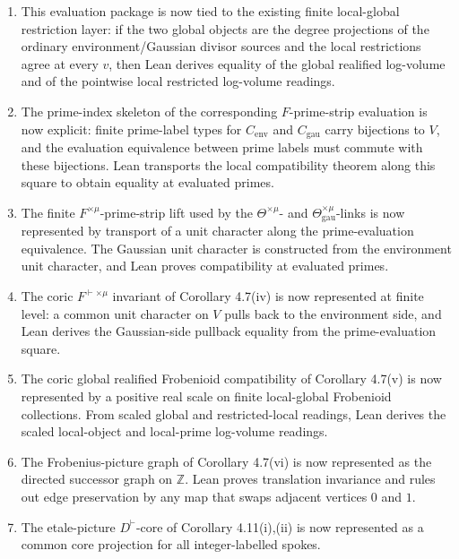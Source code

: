 \documentclass[11pt]{article}
\newcommand{\Lean}{Lean}
\theoremstyle{plain}
\theoremstyle{definition}
\theoremstyle{remark}
\begin{document}
\begin{enumerate}
  tensor-powering preserves the stored ordinary-source equality, rederives the
  theta/log-shell comparison, and multiplies the two ordinary realified
  log-volume readings by \(M\).
\item This evaluation package is now tied to the existing finite local-global
  restriction layer: if the two global objects are the degree projections of
  the ordinary environment/Gaussian divisor sources and the local restrictions
  agree at every \(v\), then \Lean{} derives equality of the global realified
  log-volume and of the pointwise local restricted log-volume readings.
\item The prime-index skeleton of the corresponding \(F\)-prime-strip
  evaluation is now explicit: finite prime-label types for
  \(C_{\mathrm{env}}\) and \(C_{\mathrm{gau}}\) carry bijections to \(V\), and
  the evaluation equivalence between prime labels must commute with these
  bijections.  \Lean{} transports the local compatibility theorem along this
  square to obtain equality at evaluated primes.
\item The finite \(F^{\times\mu}\)-prime-strip lift used by the
  \(\Theta^{\times\mu}\)- and \(\Theta^{\times\mu}_{\mathrm{gau}}\)-links is
  now represented by transport of a unit character along the prime-evaluation
  equivalence.  The Gaussian unit character is constructed from the
  environment unit character, and \Lean{} proves compatibility at evaluated
  primes.
\item The coric \(F^{\vdash\times\mu}\) invariant of Corollary 4.7(iv) is now
  represented at finite level: a common unit character on \(V\) pulls back to
  the environment side, and \Lean{} derives the Gaussian-side pullback equality
  from the prime-evaluation square.
\item The coric global realified Frobenioid compatibility of Corollary 4.7(v)
  is now represented by a positive real scale on finite local-global
  Frobenioid collections.  From scaled global and restricted-local readings,
  \Lean{} derives the scaled local-object and local-prime log-volume readings.
\item The Frobenius-picture graph of Corollary 4.7(vi) is now represented as
  the directed successor graph on \(\mathbb{Z}\).  \Lean{} proves translation
  invariance and rules out edge preservation by any map that swaps adjacent
  vertices \(0\) and \(1\).
\item The etale-picture \(D^{\vdash}\)-core of Corollary 4.11(i),(ii) is now
  represented as a common core projection for all integer-labelled spokes.

\end{enumerate}
\end{document}
